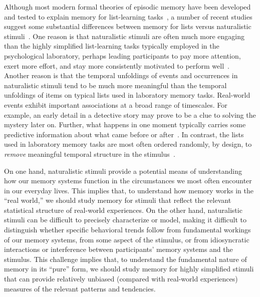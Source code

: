 \documentclass[11pt]{article}
\begin{document}
Although most modern formal theories of episodic memory have been developed and
tested to explain memory for list-learning tasks~\citep{Kaha20}, a number of
recent studies suggest some substantial differences between memory for lists
versus naturalistic stimuli~\citep[e.g., real-world experiences, narratives,
films, etc.;][]{NastEtal20, HeusEtal21, Mann21a, LeeEtal20}. One reason is that
naturalistic stimuli are often much more engaging than the highly simplified
list-learning tasks typically employed in the psychological laboratory, perhaps
leading participants to pay more attention, exert more effort, and stay more
consistently motivated to perform well~\citep{NastEtal20}. Another reason is
that the temporal unfoldings of events and occurrences in naturalistic stimuli
tend to be much more meaningful than the temporal unfoldings of items on
typical lists used in laboratory memory tasks. Real-world events exhibit
important associations at a broad range of timescales. For example, an early
detail in a detective story may prove to be a clue to solving the mystery later
on. Further, what happens in one moment typically carries some predictive
information about what came before or after~\citep{XuEtal23}. In contrast, the
lists used in laboratory memory tasks are most often ordered randomly, by
design, to \textit{remove} meaningful temporal structure in the
stimulus~\citep{Kaha12}.

On one hand, naturalistic stimuli provide a potential means of understanding
how our memory systems function in the circumstances we most often encounter in
our everyday lives. This implies that, to understand how memory works in the
``real world,'' we should study memory for stimuli that reflect the relevant
statistical structure of real-world experiences. On the other hand,
naturalistic stimuli can be difficult to precisely characterize or model,
making it difficult to distinguish whether specific behavioral trends follow
from fundamental workings of our memory systems, from some aspect of the
stimulus, or from idiosyncratic interactions or interference between
participants' memory systems and the stimulus. This challenge implies that, to
understand the fundamental nature of memory in its ``pure'' form, we should
study memory for highly simplified stimuli that can provide relatively unbiased
(compared with real-world experiences) measures of the relevant patterns and
tendencies.
\end{document}
